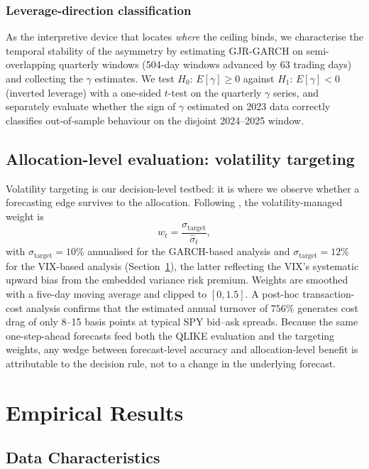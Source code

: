 \subsubsection{Leverage-direction classification}

As the interpretive device that locates \emph{where} the ceiling binds, we characterise the temporal stability of the asymmetry by estimating GJR-GARCH on semi-overlapping quarterly windows (504-day windows advanced by 63 trading days) and collecting the $\gamma$ estimates. We test $H_0\!:\,E[\gamma]\geq 0$ against $H_1\!:\,E[\gamma]<0$ (inverted leverage) with a one-sided $t$-test on the quarterly $\gamma$ series, and separately evaluate whether the sign of $\gamma$ estimated on 2023 data correctly classifies out-of-sample behaviour on the disjoint 2024--2025 window.

\subsection{Allocation-level evaluation: volatility targeting}
\label{sec:vt_methodology}

Volatility targeting is our decision-level testbed: it is where we observe whether a forecasting edge survives to the allocation. Following \citet{moreira2017}, the volatility-managed weight is
\begin{equation}
w_t = \frac{\sigma_{\text{target}}}{\hat{\sigma}_t},
\end{equation}
with $\sigma_{\text{target}}=10\%$ annualised for the GARCH-based analysis and $\sigma_{\text{target}}=12\%$ for the VIX-based analysis (Section~\ref{sec:empirical_results}), the latter reflecting the VIX's systematic upward bias from the embedded variance risk premium. Weights are smoothed with a five-day moving average and clipped to $[0,1.5]$. A post-hoc transaction-cost analysis confirms that the estimated annual turnover of $756\%$ generates cost drag of only 8--15 basis points at typical SPY bid--ask spreads. Because the same one-step-ahead forecasts feed both the QLIKE evaluation and the targeting weights, any wedge between forecast-level accuracy and allocation-level benefit is attributable to the decision rule, not to a change in the underlying forecast.


\section{Empirical Results}\label{sec:empirical_results}

\subsection{Data Characteristics}
\label{sec:data_characteristics}


